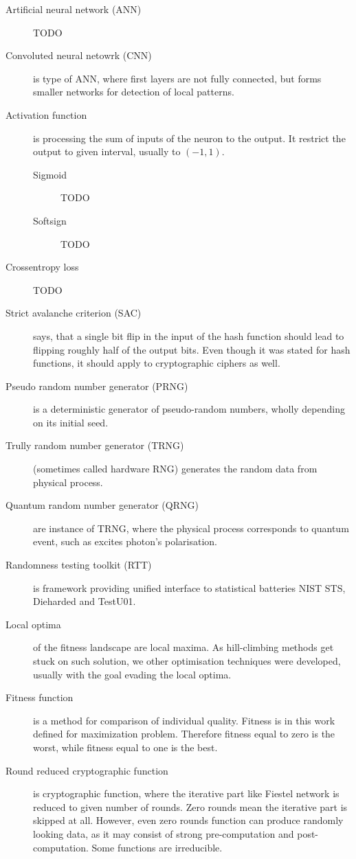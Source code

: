 \documentclass[
  print, %
  Table,   %
  nolof,     %
  nolot,     %
  11pt, %
  oneside  %
]{fithesis3}
\begin{document}
\begin{description}
    \item[Artificial neural network (ANN)] TODO
    \item[Convoluted neural netowrk (CNN)] is type of ANN, where first layers are not fully connected, but forms smaller networks for detection of local patterns.
    \item[Activation function] is processing the sum of inputs of the neuron to the output. It restrict the output to given interval, usually to $(-1, 1)$.
    \begin{description}
        \item[Sigmoid] TODO
        \item[Softsign] TODO
    \end{description}
    \item[Crossentropy loss] TODO

    \item[Strict avalanche criterion (SAC)] says, that a single bit flip in the input of the hash function should lead to flipping roughly half of the output bits. Even though it was stated for hash functions, it should apply to cryptographic ciphers as well.
    \item[Pseudo random number generator (PRNG)] is a deterministic generator of pseudo-random numbers, wholly depending on its initial seed.
    \item[Trully random number generator (TRNG)] (sometimes called hardware RNG) generates the random data from physical process.
    \item[Quantum random number generator (QRNG)] are instance of TRNG, where the physical process corresponds to quantum event, such as excites photon's polarisation.
    \item[Randomness testing toolkit (RTT)] is framework providing unified interface to statistical batteries NIST STS, Dieharded and TestU01.
    \item[Local optima] of the fitness landscape are local maxima. As hill-climbing methods get stuck on such solution, we other optimisation techniques were developed, usually with the goal evading the local optima.
    \item[Fitness function] is a method for comparison of individual quality. Fitness is in this work defined for maximization problem. Therefore fitness equal to zero is the worst, while fitness equal to one is the best.
    \item[Round reduced cryptographic function] is cryptographic function, where the iterative part like Fiestel network is reduced to given number of rounds. Zero rounds mean the iterative part is skipped at all. However, even zero rounds function can produce randomly looking data, as it may consist of strong pre-computation and post-computation. Some functions are irreducible.
\end{description}
\end{document}
